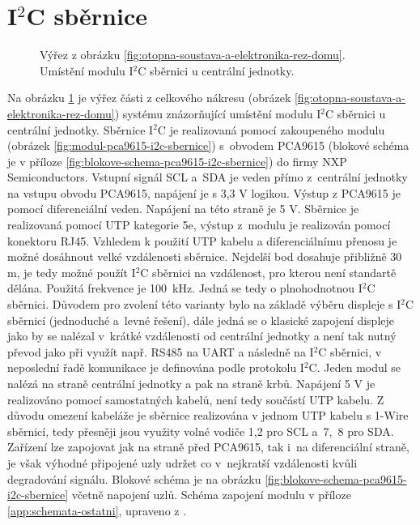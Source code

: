 \section{I$^2$C sběrnice}
\label{sec:i2c-sbernice}

\begin{figure}[H]
   \centering
    \def\svgwidth{0.3\columnwidth}
   
    \caption[Umístění modulu I$^2$C sběrnici u centrální jednotky.]{Výřez z obrázku \ref{fig:otopna-soustava-a-elektronika-rez-domu}. Umístění modulu I$^2$C sběrnici u centrální jednotky.}
    \label{fig:vyrez-i2c-sbernice}
\end{figure}

Na obrázku \ref{fig:vyrez-i2c-sbernice} je výřez části z celkového nákresu (obrázek \ref{fig:otopna-soustava-a-elektronika-rez-domu}) systému znázorňující umístění modulu I$^2$C sběrnici u centrální jednotky. Sběrnice I$^2$C je realizovaná pomocí zakoupeného modulu (obrázek \ref{fig:modul-pca9615-i2c-sbernice}) s~obvodem PCA9615 (blokové schéma je v příloze \ref{fig:blokove-schema-pca9615-i2c-sbernice}) do firmy  NXP Semiconductors. Vstupní signál SCL a~SDA je veden přímo z~centrální jednotky na vstupu obvodu PCA9615, napájení je s 3,3 V logikou. Výstup z PCA9615 je pomocí diferenciální veden. Napájení na této straně je 5 V. Sběrnice je realizovaná pomocí UTP kategorie 5e, výstup z~modulu je realizován pomocí konektoru RJ45. Vzhledem k použití UTP kabelu a diferenciálnímu přenosu je možné dosáhnout velké vzdálenosti sběrnice. Nejdelší bod dosahuje přibližně 30 m, je tedy možné použít I$^2$C sběrnici na vzdálenost, pro kterou není standartě dělána. Použitá frekvence je 100~kHz. Jedná se tedy o plnohodnotnou I$^2$C sběrnici. Důvodem pro zvolení této varianty bylo na základě výběru displeje s I$^2$C sběrnicí (jednoduché a~levné řešení), dále jedná se o klasické zapojení displeje jako by se nalézal v~krátké vzdálenosti od centrální jednotky a není tak nutný převod jako při využít např. RS485 na UART a následně na I$^2$C sběrnici, v neposlední řadě komunikace je definována podle protokolu I$^2$C.  Jeden modul se nalézá na straně centrální jednotky a pak na straně krbů. Napájení 5 V je realizováno pomocí samostatných kabelů, není tedy součástí UTP kabelu. Z důvodu omezení kabeláže je sběrnice realizována v jednom UTP kabelu s 1-Wire sběrnicí, tedy přesněji jsou využity volné vodiče 1,2 pro SCL a~7,~8 pro SDA. Zařízení lze zapojovat jak na straně před PCA9615, tak i~na diferenciální straně, je však výhodné připojené uzly udržet co v~nejkratší vzdálenosti kvůli degradování signálu. Blokové schéma je na obrázku \ref{fig:blokove-schema-pca9615-i2c-sbernice} včetně napojení uzlů. Schéma zapojení modulu v příloze \ref{app:schemata-ostatni}, upraveno z \cite{pca9615-schema-zapojeni}.


